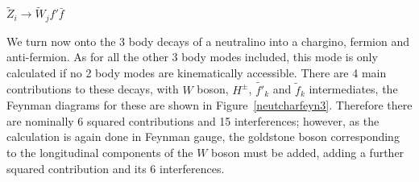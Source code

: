 \documentclass[final,3p,times,pdflatex]{elsarticle}
\begin{document}
\textbf{\underline{$\tilde{Z}_i \rightarrow \tilde{W}_j f' \bar{f}$}}

We turn now onto the 3 body decays of a neutralino into a chargino, fermion and anti-fermion. As for all the other 3 body modes included, this mode is only calculated if no 2 body modes are kinematically accessible. 
There are 4 main contributions to these decays, with $W$ boson, $H^{\pm}$, $\tilde{f'}_k$ and $\tilde{f}_k$ intermediates, the Feynman diagrams for these are shown in Figure~\ref{neutcharfeyn3}. Therefore there are nominally 6 squared contributions and 15 interferences; however, as the calculation is again done in Feynman gauge, the goldstone boson corresponding to the longitudinal components of the $W$ boson must be added, adding a further squared contribution and its 6 interferences.
\begin{figure}
    \: \: \: \:

\end{figure}
\end{document}
